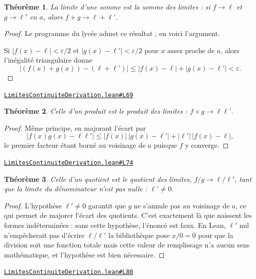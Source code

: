 \documentclass[11pt,a4paper]{article}
\theoremstyle{definition}
\theoremstyle{plain}
\newtheorem{theoreme}{Théorème}
\newcommand{\source}[2]{\par\smallskip\noindent\hfill{\footnotesize\href{#1}{\texttt{#2}}}\par\smallskip}
\begin{document}
\begin{theoreme}
La limite d'une somme est la somme des limites : si $f \to \ell$ et $g \to \ell'$ en $a$,
alors $f + g \to \ell + \ell'$.
\end{theoreme}

\begin{proof}
Le programme du lycée admet ce résultat ; en voici l'argument.

Si $|f(x) - \ell| < \varepsilon/2$ et
$|g(x) - \ell'| < \varepsilon/2$ pour $x$ assez proche de $a$, alors l'inégalité
triangulaire donne
\[ \bigl|(f(x) + g(x)) - (\ell + \ell')\bigr|
   \le |f(x) - \ell| + |g(x) - \ell'| < \varepsilon . \]
\end{proof}
\source{https://github.com/Commutator-IO/learn-lean/blob/main/courses/02-lycee/04-limites-continuite-derivation/LimitesContinuiteDerivation.lean\#L69}{LimitesContinuiteDerivation.lean\#L69}

\begin{theoreme}
Celle d'un produit est le produit des limites : $f \times g \to \ell\ell'$.
\end{theoreme}

\begin{proof}
Même principe, en majorant l'écart par
\[ |f(x)g(x) - \ell\ell'| \le |f(x)|\,|g(x) - \ell'| + |\ell'|\,|f(x) - \ell| , \]
le premier facteur étant borné au voisinage de $a$ puisque $f$ y converge.
\end{proof}
\source{https://github.com/Commutator-IO/learn-lean/blob/main/courses/02-lycee/04-limites-continuite-derivation/LimitesContinuiteDerivation.lean\#L74}{LimitesContinuiteDerivation.lean\#L74}

\begin{theoreme}
Celle d'un quotient est le quotient des limites, $f/g \to \ell/\ell'$, tant que la limite
du dénominateur n'est pas nulle : $\ell' \ne 0$.
\end{theoreme}

\begin{proof}
L'hypothèse $\ell' \ne 0$ garantit que $g$ ne s'annule pas au voisinage de $a$, ce qui
permet de majorer l'écart des quotients. C'est exactement là que naissent les formes
indéterminées : sans cette hypothèse, l'énoncé est faux. En Lean, $\ell'$ nul n'empêcherait
pas d'écrire $\ell/\ell'$ \textemdash{} la bibliothèque pose $x/0 = 0$ pour que la division
soit une fonction totale \textemdash{} mais cette valeur de remplissage n'a aucun sens
mathématique, et l'hypothèse est bien nécessaire.
\end{proof}
\source{https://github.com/Commutator-IO/learn-lean/blob/main/courses/02-lycee/04-limites-continuite-derivation/LimitesContinuiteDerivation.lean\#L80}{LimitesContinuiteDerivation.lean\#L80}
\end{document}
